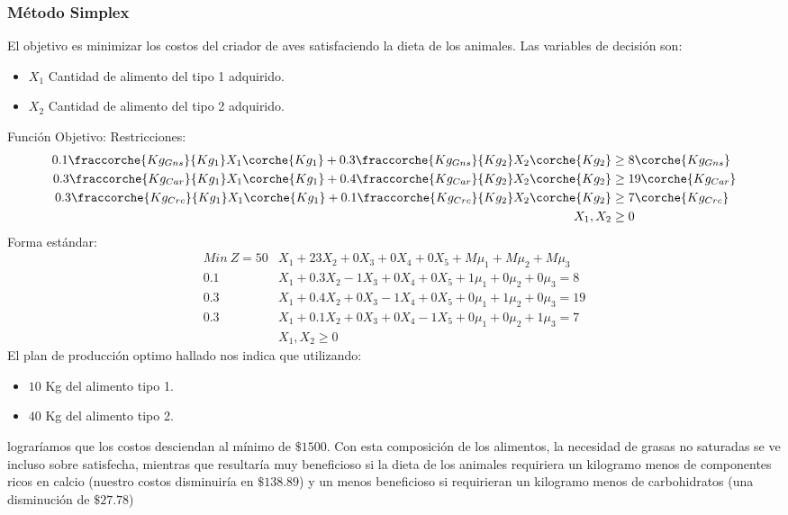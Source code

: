 \begin{homeworkProblem}

\subsubsection{Método Simplex}
El objetivo es minimizar los costos del criador de aves satisfaciendo la dieta de los animales.
Las variables de decisión son:
\begin{itemize}
  \item $X_1$ Cantidad de alimento del tipo 1 adquirido.
  \item $X_2$ Cantidad de alimento del tipo 2 adquirido.
\end{itemize}
Función Objetivo: 
Restricciones:
\begin{align*}
  0.1\fraccorche{Kg_{Gns}}{Kg_1}X_1\corche{Kg_1} + 0.3\fraccorche{Kg_{Gns}}{Kg_2}X_2\corche{Kg_2} &\ge 8\corche{Kg_{Gns}} \\
  0.3\fraccorche{Kg_{Car}}{Kg_1}X_1\corche{Kg_1} + 0.4\fraccorche{Kg_{Car}}{Kg_2}X_2\corche{Kg_2} &\ge 19\corche{Kg_{Car}} \\
  0.3\fraccorche{Kg_{Crc}}{Kg_1}X_1\corche{Kg_1} + 0.1\fraccorche{Kg_{Crc}}{Kg_2}X_2\corche{Kg_2} &\ge 7\corche{Kg_{Crc}} \\
  X_1,X_2 &\ge 0 \\
\end{align*}
Forma estándar:
\begin{align*}
    Min\ Z = 50&X_1 + 23X_2 + 0X_3 + 0X_4 + 0X_5 + M\mu_1 + M\mu_2 + M\mu_3 \\
    0.1&X_1 + 0.3X_2 - 1X_3 + 0X_4 + 0X_5 + 1\mu_1 + 0\mu_2 + 0\mu_3 = 8 \\
    0.3&X_1 + 0.4X_2 + 0X_3 - 1X_4 + 0X_5 + 0\mu_1 + 1\mu_2 + 0\mu_3 = 19 \\
    0.3&X_1 + 0.1X_2 + 0X_3 + 0X_4 - 1X_5 + 0\mu_1 + 0\mu_2 + 1\mu_3 = 7 \\
    &X_1,X_2 \ge 0
\end{align*}
El plan de producción optimo hallado nos indica que utilizando: 
\begin{itemize}
  \item $10$ Kg del alimento tipo 1.
  \item $40$ Kg del alimento tipo 2.
\end{itemize}
lograríamos que los costos desciendan al mínimo de $\$1500$. Con esta composición de los alimentos, la necesidad de grasas no saturadas se ve incluso sobre satisfecha, mientras que resultaría muy beneficioso si la dieta de los animales requiriera un kilogramo menos de componentes ricos en calcio (nuestro costos disminuiría en $\$138.89$) y un menos beneficioso si requirieran un kilogramo menos de carbohidratos (una disminución de $\$27.78$)


\end{homeworkProblem}
